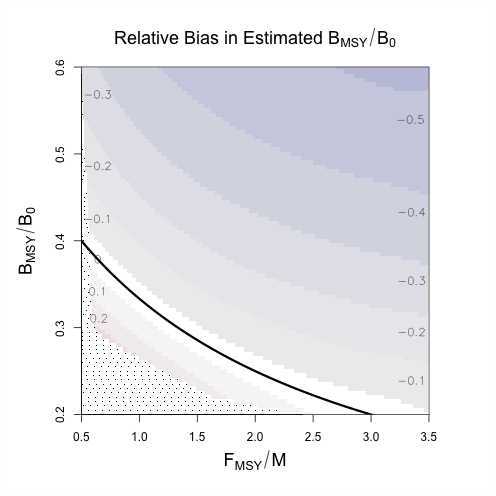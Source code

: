 \documentclass[ xcolor = pdftex, dvipsnames, table ]{beamer}
\begin{document}
%
\begin{frame}
\begin{minipage}[h!]{0.46\textwidth}
\hspace*{0.5cm}
\includegraphics[height=0.49\textheight]{../../gpBias/zetaRelBiasSchnuteExpT45N150Wide.png}\\
\hspace*{1cm}
\vspace{-1cm}
$~$\\$~$\\$~$\\$~$\\$~$\\$~$\\$~$\\$~$\\$~$\\

\end{minipage}
\end{frame}
\end{document}
